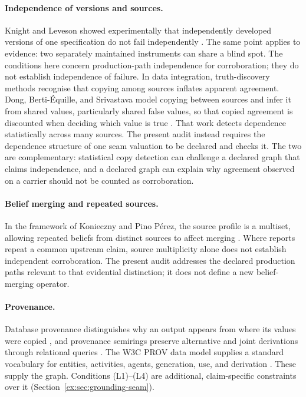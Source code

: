 \documentclass[twocolumn,envcountsect,envcountsame,natbib]{svjour3}
\begin{document}
\paragraph{Independence of versions and sources.} Knight and Leveson showed experimentally that independently developed versions of one specification do not fail independently \citep{knightleveson1986}. The same point applies to evidence: two separately maintained instruments can share a blind spot. The conditions here concern production-path independence for corroboration; they do not establish independence of failure. In data integration, truth-discovery methods recognise that copying among sources inflates apparent agreement. Dong, Berti-\'Equille, and Srivastava model copying between sources and infer it from shared values, particularly shared false values, so that copied agreement is discounted when deciding which value is true \citep{dong2009}. That work detects dependence statistically across many sources. The present audit instead requires the dependence structure of one seam valuation to be declared and checks it. The two are complementary: statistical copy detection can challenge a declared graph that claims independence, and a declared graph can explain why agreement observed on a carrier should not be counted as corroboration.

\paragraph{Belief merging and repeated sources.}
In the framework of Konieczny and Pino P\'erez, the source profile
is a multiset, allowing repeated beliefs from distinct sources to
affect merging \citep{konieczny2002merging}. Where reports repeat
a common upstream claim, source multiplicity alone does not establish
independent corroboration. The present audit addresses the declared
production paths relevant to that evidential distinction; it does
not define a new belief-merging operator.

\paragraph{Provenance.} Database provenance distinguishes why an output appears from where its values were copied \citep{buneman2001}, and provenance semirings preserve alternative and joint derivations through relational queries \citep{greenkarvounarakistannen2007}. The W3C PROV data model supplies a standard vocabulary for entities, activities, agents, generation, use, and derivation \citep{w3cprovdm2013}. These supply the graph. Conditions (L1)--(L4) are additional, claim-specific constraints over it (Section~\ref{ex:sec:grounding-seam}).
\end{document}
